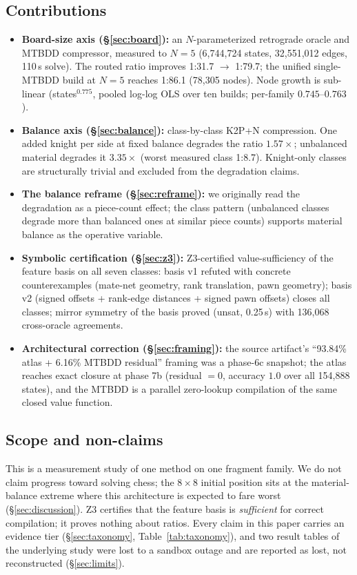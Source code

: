 \documentclass[conference]{IEEEtran}
\begin{document}
\subsection{Contributions}
\begin{itemize}
\item \textbf{Board-size axis (\S\ref{sec:board}):} an $N$-parameterized
retrograde oracle and MTBDD compressor, measured to $N{=}5$
(6{,}744{,}724 states, 32{,}551{,}012 edges, 110\,s solve). The routed
ratio improves 1:31.7 $\to$ 1:79.7; the unified single-MTBDD build at
$N{=}5$ reaches 1:86.1 (78{,}305 nodes). Node growth is sub-linear
(states$^{0.775}$, pooled log-log OLS over ten builds; per-family
$0.745$--$0.763$).
\item \textbf{Balance axis (\S\ref{sec:balance}):} class-by-class K2P+N
compression. One added knight per side at fixed balance degrades the ratio
$1.57\times$; unbalanced material degrades it $3.35\times$ (worst measured
class 1:8.7). Knight-only classes are structurally trivial and excluded from
the degradation claims.
\item \textbf{The balance reframe (\S\ref{sec:reframe}):} we originally read
the degradation as a piece-count effect; the class pattern (unbalanced
classes degrade more than balanced ones at similar piece counts) supports
material balance as the operative variable.
\item \textbf{Symbolic certification (\S\ref{sec:z3}):} Z3-certified
value-sufficiency of the feature basis on all seven classes: basis v1
refuted with concrete counterexamples (mate-net geometry, rank translation,
pawn geometry); basis v2 (signed offsets + rank-edge distances + signed pawn
offsets) closes all classes; mirror symmetry of the basis proved (unsat,
0.25\,s) with 136{,}068 cross-oracle agreements.
\item \textbf{Architectural correction (\S\ref{sec:framing}):} the source
artifact's ``93.84\% atlas + 6.16\% MTBDD residual'' framing was a phase-6c
snapshot; the atlas reaches exact closure at phase 7b (residual $=0$,
accuracy $1.0$ over all 154{,}888 states), and the MTBDD is a parallel
zero-lookup compilation of the same closed value function.
\end{itemize}

\subsection{Scope and non-claims}
This is a measurement study of one method on one fragment family. We do not
claim progress toward solving chess; the $8\times8$ initial position sits at
the material-balance extreme where this architecture is expected to fare
worst (\S\ref{sec:discussion}). Z3 certifies that the feature basis is
\emph{sufficient} for correct compilation; it proves nothing about ratios.
Every claim in this paper carries an evidence tier (\S\ref{sec:taxonomy},
Table~\ref{tab:taxonomy}), and two result tables of the underlying study
were lost to a sandbox outage and are reported as lost, not reconstructed
(\S\ref{sec:limits}).
\end{document}
